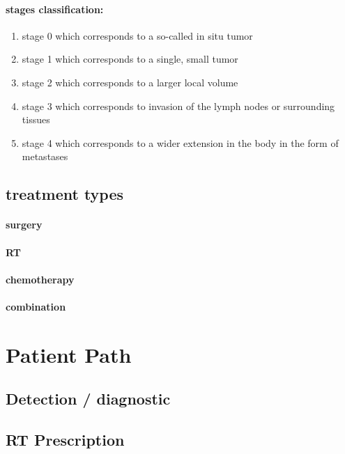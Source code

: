 \paragraph{stages classification:}
\begin{enumerate}
	\item stage 0 which corresponds to a so-called in situ tumor
	\item stage 1 which corresponds to a single, small tumor
	\item stage 2 which corresponds to a larger local volume
	\item stage 3 which corresponds to invasion of the lymph nodes or surrounding tissues
	\item stage 4 which corresponds to a wider extension in the body in the form of metastases
\end{enumerate}

\subsection{treatment types}
\paragraph{surgery}
\paragraph{RT}
\paragraph{chemotherapy}
\paragraph{combination}

\section{Patient Path}

\subsection{Detection / diagnostic}
\subsection{RT Prescription}
